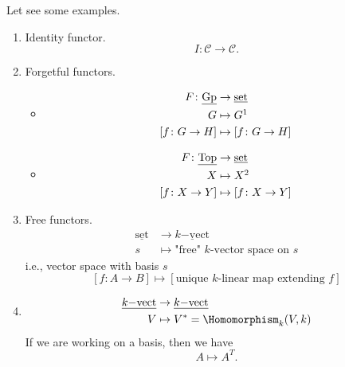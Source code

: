 \begin{eg}
	Let see some examples.
	\begin{enumerate}
		\item Identity functor.
		      \[
			      I\colon \mathscr{C} \to \mathscr{C}.
		      \]
		\item Forgetful functors.
		      \begin{itemize}
			      \item \[
				            \begin{split}
					            F\colon \underline{\mathrm{Gp}}&\to \underline{\mathrm{set}} \\
					            G&\mapsto G\footnotemark\\
					            \left[f\colon G\to H\right]&\mapsto \left[f\colon G\to H\right]
				            \end{split}
			            \]
			            \addtocounter{footnote}{-1}
			      \item \[
				            \begin{split}
					            F\colon \underline{\mathrm{Top}}&\to \underline{\mathrm{set}}\\
					            X&\mapsto X\footnotemark\\
					            \left[f\colon X\to Y\right]&\mapsto \left[f\colon X\to Y\right]
				            \end{split}
			            \]
			            \addtocounter{footnote}{-1}
		      \end{itemize}
		\item Free functors.
		      \[
			      \begin{split}
				      \underline{\mathrm{set}}&\to \underline{k\mathrm{-vect}}  \\
				      s&\mapsto \text{"free" \(k\)-vector space on \(s\)}
			      \end{split}
		      \]
		      i.e., vector space with basis \(s\)
		      \[
			      \left[f\colon A\to B\right]\mapsto \left[\text{unique \(k\)-linear map extending \(f\)}\right]
		      \]
		\item
		      \[
			      \begin{split}
				      \underline{k\mathrm{-vect}}&\to \underline{k\mathrm{-vect}}  \\
				      V&\mapsto V^{*} = \Homomorphism _k(V, k)
			      \end{split}
		      \]
		      If we are working on a basis, then we have
		      \[
			      A\mapsto A^{T}.
		      \]
	\end{enumerate}
\end{eg}

